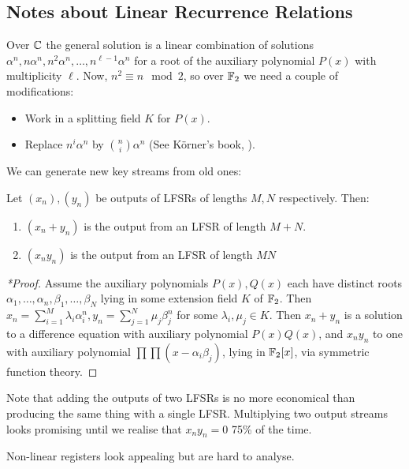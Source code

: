 \documentclass[10pt,a4paper]{article}
\begin{document}
\subsection{Notes about Linear Recurrence Relations}
Over $\mathbb{C}$ the general solution is a linear combination of solutions $\alpha^n, n\alpha^n, n^2\alpha^n, \ldots, n^{\ell-1}\alpha^n$ for a root of the auxiliary polynomial $P(x)$ with multiplicity $\ell$. Now, $n^2 \equiv n \mod 2$, so over $\mathbb{F}_2$ we need a couple of modifications:
\begin{itemize}
\item Work in a splitting field $K$ for $P(x)$. 
\item Replace $n^i \alpha^n$ by $\binom{n}{i}\alpha^n$ (See K\"orner's book, ).
\end{itemize}
We can generate new key streams from old ones:
\begin{lemma}
Let $(x_n), (y_n)$ be outputs of LFSRs of lengths $M,N$ respectively. Then:
\begin{enumerate}
\item $(x_n+y_n)$ is the output from an LFSR of length $M+N$.
\item $(x_ny_n)$ is the output from an LFSR of length $MN$
\end{enumerate}
\end{lemma}
\begin{proof}[*Proof]
Assume the auxiliary polynomials $P(x), Q(x)$ each have distinct roots $\alpha_1, \ldots, \alpha_n, \beta_1, \ldots, \beta_N$ lying in some extension field $K$ of $\mathbb{F}_2$. Then $x_n = \sum_{i=1}^M \lambda_i \alpha_i^n, y_n = \sum_{j=1}^N \mu_j \beta_j^n$ for some $\lambda_i, \mu_j \in K$. Then $x_n+y_n$ is a solution to a difference equation with auxiliary polynomial $P(x)Q(x)$, and $x_ny_n$ to one with auxiliary polynomial $\prod\prod (x-\alpha_i\beta_j)$, lying in $\mathbb{F}_2[x]$, via symmetric function theory.
\end{proof}
Note that adding the outputs of two LFSRs is no more economical than producing the same thing with a single LFSR. Multiplying two output streams looks promising until we realise that $x_ny_n = 0$ 75\% of the time.

Non-linear registers look appealing but are hard to analyse.
\end{document}
